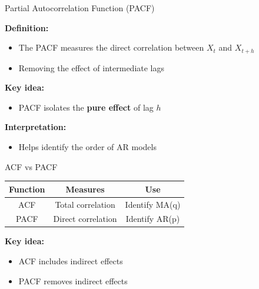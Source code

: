 \documentclass[aspectratio=169]{beamer}
\begin{document}
\begin{frame}{Partial Autocorrelation Function (PACF)}

\textbf{Definition:}
\begin{itemize}
    \item The PACF measures the direct correlation between $X_t$ and $X_{t+h}$
    \item Removing the effect of intermediate lags
\end{itemize}

\vspace{0.4cm}

\textbf{Key idea:}
\begin{itemize}
    \item PACF isolates the \textbf{pure effect} of lag $h$
\end{itemize}

\vspace{0.4cm}

\textbf{Interpretation:}
\begin{itemize}
    \item Helps identify the order of AR models
\end{itemize}

\end{frame}

\begin{frame}{ACF vs PACF}

\begin{center}
\begin{tabular}{|c|c|c|}
\hline
\textbf{Function} & \textbf{Measures} & \textbf{Use} \\
\hline
ACF & Total correlation & Identify MA(q) \\
\hline
PACF & Direct correlation & Identify AR(p) \\
\hline
\end{tabular}
\end{center}

\vspace{0.4cm}

\textbf{Key idea:}
\begin{itemize}
    \item ACF includes indirect effects
    \item PACF removes indirect effects
\end{itemize}

\end{frame}
\end{document}

